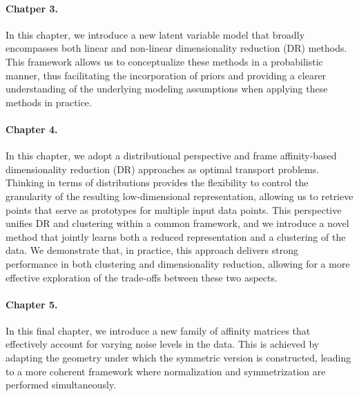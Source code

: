 \paragraph{Chatper 3.} 
In this chapter, we introduce a new latent variable model that broadly encompasses both linear and non-linear dimensionality reduction (DR) methods. This framework allows us to conceptualize these methods in a probabilistic manner, thus facilitating the incorporation of priors and providing a clearer understanding of the underlying modeling assumptions when applying these methods in practice.

\paragraph{Chapter 4.} 
In this chapter, we adopt a distributional perspective and frame affinity-based dimensionality reduction (DR) approaches as optimal transport problems. Thinking in terms of distributions provides the flexibility to control the granularity of the resulting low-dimensional representation, allowing us to retrieve points that serve as prototypes for multiple input data points. This perspective unifies DR and clustering within a common framework, and we introduce a novel method that jointly learns both a reduced representation and a clustering of the data. We demonstrate that, in practice, this approach delivers strong performance in both clustering and dimensionality reduction, allowing for a more effective exploration of the trade-offs between these two aspects.

\paragraph{Chapter 5.} 
In this final chapter, we introduce a new family of affinity matrices that effectively account for varying noise levels in the data. This is achieved by adapting the geometry under which the symmetric version is constructed, leading to a more coherent framework where normalization and symmetrization are performed simultaneously.
